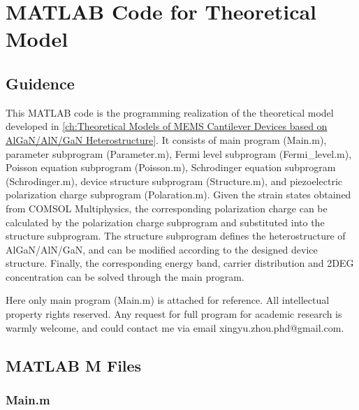 \chapter{MATLAB Code for Theoretical Model} 

\section*{Guidence}

This MATLAB code is the programming realization of the theoretical model developed in \autoref{ch:Theoretical Models of MEMS Cantilever Devices based on AlGaN/AlN/GaN Heterostructure}. It consists of main program (Main.m), parameter subprogram (Parameter.m), Fermi level subprogram (Fermi\_level.m), Poisson equation subprogram (Poisson.m), Schrodinger equation subprogram (Schrodinger.m), device structure subprogram (Structure.m), and piezoelectric polarization charge subprogram (Polaration.m). Given the strain states obtained from COMSOL Multiphysics, the corresponding polarization charge can be calculated by the polarization charge subprogram and substituted into the structure subprogram. The structure subprogram defines the heterostructure of AlGaN/AlN/GaN, and can be modified according to the designed device structure. Finally, the corresponding energy band, carrier distribution and 2DEG concentration can be solved through the main program.

Here only main program (Main.m) is attached for reference. All intellectual property rights reserved. Any request for full program for academic research is warmly welcome, and could contact me via email xingyu.zhou.phd@gmail.com.
\clearpage

\section*{MATLAB M Files}

\subsection*{Main.m}




